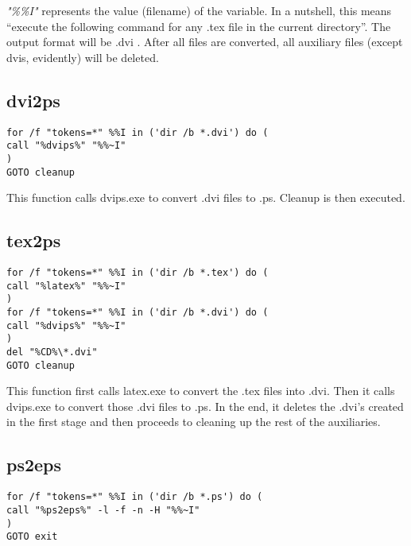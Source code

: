 \documentclass{article}
\begin{document}
\textit{"\%\%I"} represents the value (filename) of the variable. In a nutshell, this means ``execute the following command for any .tex file in the current directory''. The output format will be .dvi . After all files are converted, all auxiliary files (except dvis, evidently) will be deleted.
\subsection{dvi2ps}

\begin{mdframed}[style=code]
\begin{lstlisting}[breaklines]
for /f "tokens=*" %%I in ('dir /b *.dvi') do (
call "%dvips%" "%%~I"
)
GOTO cleanup
\end{lstlisting}
\end{mdframed}

This function calls dvips.exe to convert .dvi files to .ps. Cleanup is then executed.
\subsection{tex2ps}

\begin{mdframed}[style=code]
\begin{lstlisting}[breaklines]
for /f "tokens=*" %%I in ('dir /b *.tex') do (
call "%latex%" "%%~I"
)
for /f "tokens=*" %%I in ('dir /b *.dvi') do (
call "%dvips%" "%%~I"
)
del "%CD%\*.dvi"
GOTO cleanup
\end{lstlisting}
\end{mdframed}

This function first calls latex.exe to convert the .tex files into .dvi. Then it calls dvips.exe to convert those .dvi files to .ps. In the end, it deletes the .dvi's created in the first stage and then proceeds to cleaning up the rest of the auxiliaries. 
\subsection{ps2eps}

\begin{mdframed}[style=code]
\begin{lstlisting}[breaklines]
for /f "tokens=*" %%I in ('dir /b *.ps') do (
call "%ps2eps%" -l -f -n -H "%%~I"
)
GOTO exit
\end{lstlisting}
\end{mdframed}
\end{document}
